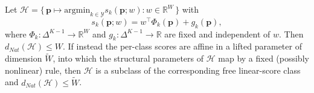 \begin{lemma}\label{lem:linear_embedding}
    Let $\mathcal{H} = \{\, \mathbf{p} \mapsto \mathrm{argmin}_{k \in \mathcal{Y}} s_k(\mathbf{p}; w) : w \in \mathbb{R}^{W} \,\}$ with
    \begin{equation}
        s_k(\mathbf{p}; w) = w^\top \Phi_k(\mathbf{p}) + g_k(\mathbf{p}),
    \end{equation}
    where $\Phi_k: \Delta^{K-1} \to \mathbb{R}^{W}$ and $g_k: \Delta^{K-1} \to \mathbb{R}$ are fixed and independent of $w$. Then $d_{Nat}(\mathcal{H}) \leq W$. If instead the per-class scores are affine in a lifted parameter of dimension $\widetilde{W}$, into which the structural parameters of $\mathcal{H}$ map by a fixed (possibly nonlinear) rule, then $\mathcal{H}$ is a subclass of the corresponding free linear-score class and $d_{Nat}(\mathcal{H}) \leq \widetilde{W}$.
\end{lemma}
